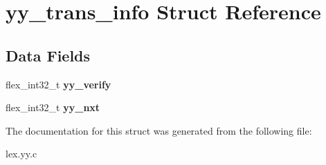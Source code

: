 \hypertarget{structyy__trans__info}{}\section{yy\+\_\+trans\+\_\+info Struct Reference}
\label{structyy__trans__info}
\subsection*{Data Fields}
\begin{DoxyCompactItemize}
\item 
\mbox{\label{structyy__trans__info_a5faf5583708f5fa457bc1cb9bab86e38}} 
flex\+\_\+int32\+\_\+t {\bfseries yy\+\_\+verify}
\item 
\mbox{\label{structyy__trans__info_a51bfd9e47041873b7b8075c677d1cfe1}} 
flex\+\_\+int32\+\_\+t {\bfseries yy\+\_\+nxt}
\end{DoxyCompactItemize}


The documentation for this struct was generated from the following file\+:\begin{DoxyCompactItemize}
\item 
lex.\+yy.\+c\end{DoxyCompactItemize}
